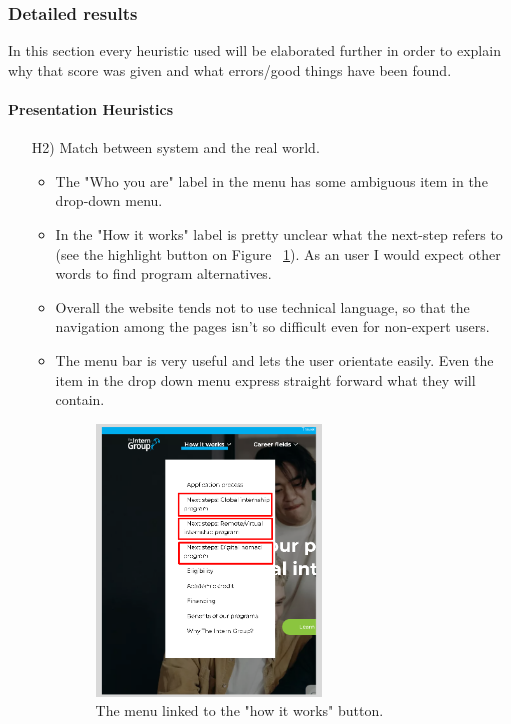 \documentclass[11pt, letterpaper]{article}
\begin{document}
\subsubsection{Detailed results}
In this section every heuristic used will be elaborated further in order to explain why that score was given and what errors/good things have been found.

\paragraph{Presentation Heuristics}
\begin{enumerate}
    \item[H2)] Match between system and the real world. 
        \begin{itemize}
            \item The "Who you are" label in the menu has some ambiguous item in the drop-down menu.  
            \item In the "How it works" label is pretty unclear what the next-step refers to (see the highlight button on Figure ~\ref{fig:H2}). As an user I would expect other words to find program alternatives.
            \item Overall the website tends not to use technical language, so that the navigation among the pages isn't so difficult even for non-expert users.
            \item The menu bar is very useful and lets the user orientate easily. Even the item in the drop down menu express straight forward what they will contain.
            \begin{figure}[H]
                    \centering
                    \includegraphics[width=6cm]{images/inspection/H2.png}
                    \caption{The menu linked to the "how it works" button.}
                    \label{fig:H2}
                \end{figure}

\end{itemize}
\end{enumerate}
\end{document}
